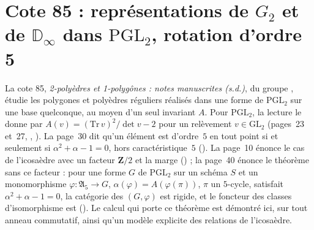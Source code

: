 \section[Cote 85 : représentations de $G_2$ et de $\mathbb D_\infty$ dans $\mathrm{PGL}_2$, rotation d'ordre 5]{Cote 85 : représentations de $G_2$ et de $\mathbb D_\infty$ dans $\mathrm{PGL}_2$, rotation d'ordre 5\protect{}}\label{sec:85}

La cote 85, \emph{2-polyèdres et 1-polygônes : notes manuscrites (s.d.)}, du groupe , étudie les polygones et polyèdres réguliers réalisés dans une forme de $\mathrm{PGL}_2$ sur une base quelconque, au moyen d'un seul invariant $A$. Pour $\mathrm{PGL}_2$, la lecture le donne par $A(v) = (\mathrm{Tr}\, v)^2/\det v - 2$ pour un relèvement $v \in \mathrm{GL}_2$ (pages~23 et~27, , ). La page~30 dit qu'un élément est d'ordre~$5$ en tout point si et seulement si $\alpha^2 + \alpha - 1 = 0$, hors caractéristique~$5$ (). La page~10 énonce le cas de l'icosaèdre avec un facteur $\mathbf Z/2$ et la marge  () ; la page~40 énonce le théorème sans ce facteur : pour une forme $G$ de $\mathrm{PGL}_2$ sur un schéma $S$ et un monomorphisme $\varphi : \mathfrak A_5 \to G$, $\alpha(\varphi) = A(\varphi(\pi))$, $\pi$ un $5$-cycle, satisfait $\alpha^2 + \alpha - 1 = 0$, la catégorie des $(G, \varphi)$ est rigide, et le foncteur des classes d'isomorphisme est  (). Le calcul qui porte ce théorème est démontré ici, sur tout anneau commutatif, ainsi qu'un modèle explicite des relations de l'icosaèdre.

